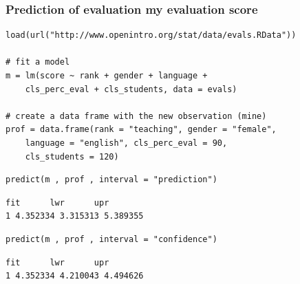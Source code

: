 \documentclass[slidestop,compress,mathserif,12pt,t,professionalfonts,xcolor=table]{beamer}
\begin{document}

\begin{frame}[fragile]
\frametitle{Prediction of evaluation my evaluation score}

\vspace{-0.2cm}

{\scriptsize
\begin{Verbatim}[frame=single, formatcom=\color{blue}]
load(url("http://www.openintro.org/stat/data/evals.RData"))

# fit a model
m = lm(score ~ rank + gender + language + 
    cls_perc_eval + cls_students, data = evals)

# create a data frame with the new observation (mine)
prof = data.frame(rank = "teaching", gender = "female", 
    language = "english", cls_perc_eval = 90, 
    cls_students = 120)
\end{Verbatim}
}

\pause

{\scriptsize
\begin{Verbatim}[frame=single, formatcom=\color{blue}]
predict(m , prof , interval = "prediction")
\end{Verbatim}
}

\pause

{\scriptsize
\begin{Verbatim}[frame=single, formatcom=\color{gray}]
       fit      lwr      upr
1 4.352334 3.315313 5.389355
\end{Verbatim}
}

\pause

{\scriptsize
\begin{Verbatim}[frame=single, formatcom=\color{blue}]
predict(m , prof , interval = "confidence")
\end{Verbatim}
}

\pause

{\scriptsize
\begin{Verbatim}[frame=single, formatcom=\color{gray}]
       fit      lwr      upr
1 4.352334 4.210043 4.494626
\end{Verbatim}
}

\end{frame}

\end{document}
